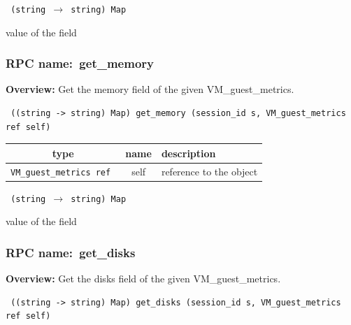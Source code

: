\vspace{0.3cm}

{\tt 
(string $\rightarrow$ string) Map
}


value of the field
\vspace{0.3cm}
\vspace{0.3cm}
\vspace{0.3cm}
\subsubsection{RPC name:~get\_memory}

{\bf Overview:} 
Get the memory field of the given VM\_guest\_metrics.

\begin{verbatim} ((string -> string) Map) get_memory (session_id s, VM_guest_metrics ref self)\end{verbatim}



 
\vspace{0.3cm}
\begin{tabular}{|c|c|p{7cm}|}
 \hline
{\bf type} & {\bf name} & {\bf description} \\ \hline
{\tt VM\_guest\_metrics ref } & self & reference to the object \\ \hline 

\end{tabular}

\vspace{0.3cm}

{\tt 
(string $\rightarrow$ string) Map
}


value of the field
\vspace{0.3cm}
\vspace{0.3cm}
\vspace{0.3cm}
\subsubsection{RPC name:~get\_disks}

{\bf Overview:} 
Get the disks field of the given VM\_guest\_metrics.

\begin{verbatim} ((string -> string) Map) get_disks (session_id s, VM_guest_metrics ref self)\end{verbatim}



